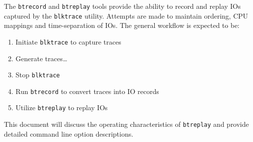 %
%
%
%
%
%
The \texttt{btrecord} and \texttt{btreplay} tools provide the ability to
record and replay IOs captured by the \texttt{blktrace} utility. Attempts
are made to maintain ordering, CPU mappings and time-separation of IOs. The
general workflow is expected to be:

\begin{enumerate}
  \item Initiate \texttt{blktrace} to capture traces
  \item Generate traces\ldots
  \item Stop \texttt{blktrace}
  \item Run \texttt{btrecord} to convert traces into IO records 
  \item Utilize \texttt{btreplay} to replay IOs 
\end{enumerate}

This document will discuss the operating characteristics of
\texttt{btreplay} and provide detailed command line option descriptions.
